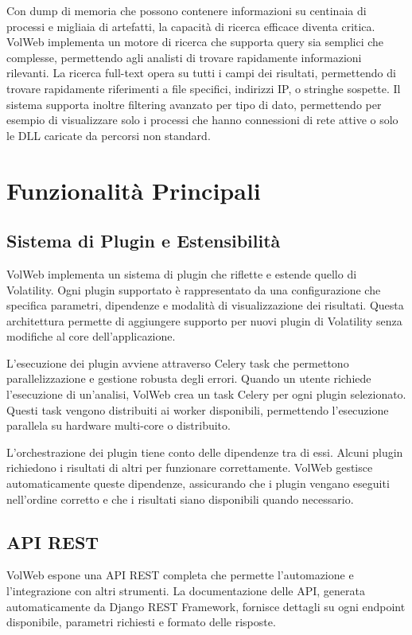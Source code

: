 Con dump di memoria che possono contenere informazioni su centinaia di processi e migliaia di artefatti, la capacità di ricerca efficace diventa critica. VolWeb implementa un motore di ricerca che supporta query sia semplici che complesse, permettendo agli analisti di trovare rapidamente informazioni rilevanti. La ricerca full-text opera su tutti i campi dei risultati, permettendo di trovare rapidamente riferimenti a file specifici, indirizzi IP, o stringhe sospette. Il sistema supporta inoltre filtering avanzato per tipo di dato, permettendo per esempio di visualizzare solo i processi che hanno connessioni di rete attive o solo le DLL caricate da percorsi non standard.

\section{Funzionalità Principali}

\subsection{Sistema di Plugin e Estensibilità}

VolWeb implementa un sistema di plugin che riflette e estende quello di Volatility. Ogni plugin supportato è rappresentato da una configurazione che specifica parametri, dipendenze e modalità di visualizzazione dei risultati. Questa architettura permette di aggiungere supporto per nuovi plugin di Volatility senza modifiche al core dell'applicazione.

L'esecuzione dei plugin avviene attraverso Celery task che permettono parallelizzazione e gestione robusta degli errori. Quando un utente richiede l'esecuzione di un'analisi, VolWeb crea un task Celery per ogni plugin selezionato. Questi task vengono distribuiti ai worker disponibili, permettendo l'esecuzione parallela su hardware multi-core o distribuito.

L'orchestrazione dei plugin tiene conto delle dipendenze tra di essi. Alcuni plugin richiedono i risultati di altri per funzionare correttamente. VolWeb gestisce automaticamente queste dipendenze, assicurando che i plugin vengano eseguiti nell'ordine corretto e che i risultati siano disponibili quando necessario.

\subsection{API REST}

VolWeb espone una API REST completa che permette l'automazione e l'integrazione con altri strumenti. La documentazione delle API, generata automaticamente da Django REST Framework, fornisce dettagli su ogni endpoint disponibile, parametri richiesti e formato delle risposte.

